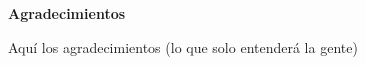 \thispagestyle{empty}

\parindent=16mm

\vspace*{2cm}

\begin{flushleft}
  \begin{Large}
    \textbf{Agradecimientos}\\
  \end{Large}
  \masterRule
\end{flushleft}

Aquí los agradecimientos (lo que solo entenderá la gente) 

\emptyPage

